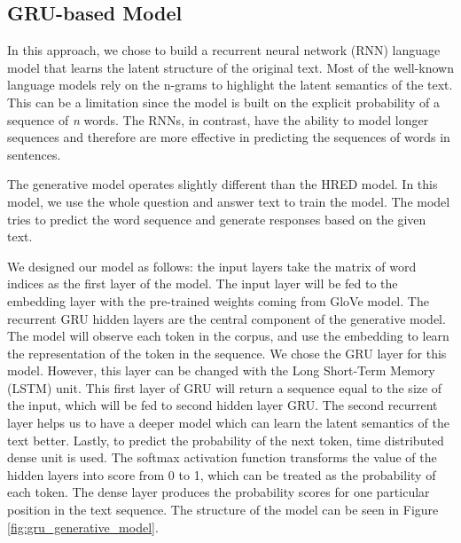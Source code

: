 \vspace{-0.9em}
\subsection{GRU-based Model}
In this approach, we chose to build a recurrent neural network (RNN) language model that learns the latent structure of the original text. Most of the well-known language models rely on the n-grams to highlight the latent semantics of the text. This can be a limitation since the model is built on the explicit probability of a sequence of \textit{n} words.  The RNNs, in contrast, have the ability to model longer sequences and therefore are more effective in predicting the sequences of words in sentences.  

The generative model operates slightly different than the HRED model. In this model, we use the whole question and answer text to train the model. The model tries to predict the word sequence and generate responses based on the given text. 

We designed our model as follows: the input layers take the matrix of word indices as the first layer of the model. The input layer will be fed to the embedding layer with the pre-trained weights coming from GloVe model. The recurrent GRU hidden layers are the central component of the generative model. The model will observe each token in the corpus, and use the embedding to learn the representation of the token in the sequence. We chose the GRU layer for this model. However, this layer can be changed with the Long Short-Term Memory (LSTM) unit. This first layer of GRU will return a sequence equal to the size of the input, which will be fed to second hidden layer GRU. The second recurrent layer helps us to have a deeper model which can learn the latent semantics of the text better. Lastly, to predict the probability of the next token, time distributed dense unit is used. The softmax activation function transforms the value of the hidden layers into score from 0 to 1, which can be treated as the probability of each token. The dense layer produces the probability scores for one particular position in the text sequence. The structure of the model can be seen in Figure \ref{fig:gru_generative_model}.


\vspace{-0.75em}

